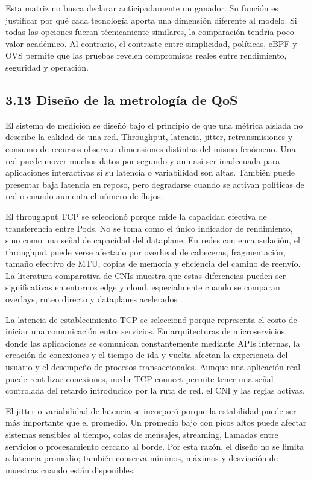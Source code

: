 \documentclass[journal]{IEEEtran}
\begin{document}
Esta matriz no busca declarar anticipadamente un ganador. Su función es justificar por qué cada tecnología aporta una dimensión diferente al modelo. Si todas las opciones fueran técnicamente similares, la comparación tendría poco valor académico. Al contrario, el contraste entre simplicidad, políticas, eBPF y OVS permite que las pruebas revelen compromisos reales entre rendimiento, seguridad y operación.

\subsection{3.13 Diseño de la metrología de QoS}

El sistema de medición se diseñó bajo el principio de que una métrica aislada no describe la calidad de una red. Throughput, latencia, jitter, retransmisiones y consumo de recursos observan dimensiones distintas del mismo fenómeno. Una red puede mover muchos datos por segundo y aun así ser inadecuada para aplicaciones interactivas si su latencia o variabilidad son altas. También puede presentar baja latencia en reposo, pero degradarse cuando se activan políticas de red o cuando aumenta el número de flujos.

El throughput TCP se seleccionó porque mide la capacidad efectiva de transferencia entre Pods. No se toma como el único indicador de rendimiento, sino como una señal de capacidad del dataplane. En redes con encapsulación, el throughput puede verse afectado por overhead de cabeceras, fragmentación, tamaño efectivo de MTU, copias de memoria y eficiencia del camino de reenvío. La literatura comparativa de CNIs muestra que estas diferencias pueden ser significativas en entornos edge y cloud, especialmente cuando se comparan overlays, ruteo directo y dataplanes acelerados \cite{ref7,ref8}.

La latencia de establecimiento TCP se seleccionó porque representa el costo de iniciar una comunicación entre servicios. En arquitecturas de microservicios, donde las aplicaciones se comunican constantemente mediante APIs internas, la creación de conexiones y el tiempo de ida y vuelta afectan la experiencia del usuario y el desempeño de procesos transaccionales. Aunque una aplicación real puede reutilizar conexiones, medir TCP connect permite tener una señal controlada del retardo introducido por la ruta de red, el CNI y las reglas activas.

El jitter o variabilidad de latencia se incorporó porque la estabilidad puede ser más importante que el promedio. Un promedio bajo con picos altos puede afectar sistemas sensibles al tiempo, colas de mensajes, streaming, llamadas entre servicios o procesamiento cercano al borde. Por esta razón, el diseño no se limita a latencia promedio; también conserva mínimos, máximos y desviación de muestras cuando están disponibles.
\end{document}
